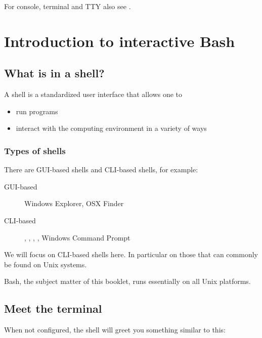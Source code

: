 \documentclass{olli-handout}
\begin{document}
For console, terminal and TTY also see .

\chapter{Introduction to interactive Bash}

\section{What is in a shell?}

A shell is a standardized user interface that allows one to

\begin{itemize}
	\item run programs
	\item interact with the computing environment in a variety of ways
\end{itemize}

\subsection{Types of shells}

There are GUI-based shells and CLI-based shells, for example:

\begin{description}
	\item[GUI-based] Windows Explorer, OSX Finder
	\item[CLI-based] , , , , Windows Command Prompt
\end{description}

\begin{hintbox}
    {\olliHandLeft} We will focus on CLI-based shells here. In particular on those that can commonly be found on Unix systems.

    Bash, the subject matter of this booklet, runs essentially on all Unix platforms.
\end{hintbox}

\section{Meet the terminal}

When not configured, the shell will greet you something similar to this:

\end{document}
